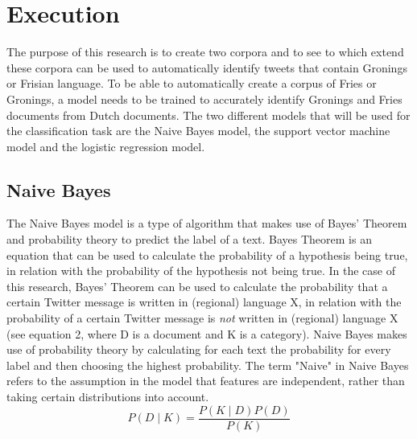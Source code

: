 \documentclass[
10pt, %
a4paper, %
oneside, %
headinclude,footinclude, %
] {book}%
\begin{document}
\section{Execution}
The purpose of this research is to create two corpora and to see to which extend these corpora can be used to automatically identify tweets that contain Gronings or Frisian language. 
To be able to automatically create a corpus of Fries or Gronings, a model needs to be trained to accurately identify Gronings and Fries documents from Dutch documents. The two different models that will be used for the classification task are the Naive Bayes model, the support vector machine model and the logistic regression model.\\

\subsection{Naive Bayes}
The Naive Bayes model is a type of algorithm that makes use of Bayes' Theorem and probability theory to predict the label of a text. Bayes Theorem is an equation that can be used to calculate the probability of a hypothesis being true, in relation with the probability of the hypothesis not being true. In the case of this research, Bayes' Theorem can be used to calculate the probability that a certain Twitter message is written in (regional) language X, in relation with the probability of a certain Twitter message is \emph{not} written in (regional) language X (see equation 2, where D is a document and K is a category). Naive Bayes makes use of probability theory by calculating for each text the probability for every label and then choosing the highest probability. The term "Naive" in Naive Bayes refers to the assumption in the model that features are independent, rather than taking certain distributions into account. 
\begin{equation}
P(D \mid K)=\frac{P(K \mid D) P(D)}{P(K)}
\end{equation}
\end{document}
